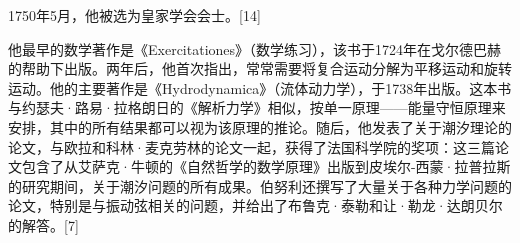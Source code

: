 1750年5月，他被选为皇家学会会士。[14]



他最早的数学著作是《Exercitationes》（数学练习），该书于1724年在戈尔德巴赫的帮助下出版。两年后，他首次指出，常常需要将复合运动分解为平移运动和旋转运动。他的主要著作是《Hydrodynamica》（流体动力学），于1738年出版。这本书与约瑟夫·路易·拉格朗日的《解析力学》相似，按单一原理——能量守恒原理来安排，其中的所有结果都可以视为该原理的推论。随后，他发表了关于潮汐理论的论文，与欧拉和科林·麦克劳林的论文一起，获得了法国科学院的奖项：这三篇论文包含了从艾萨克·牛顿的《自然哲学的数学原理》出版到皮埃尔-西蒙·拉普拉斯的研究期间，关于潮汐问题的所有成果。伯努利还撰写了大量关于各种力学问题的论文，特别是与振动弦相关的问题，并给出了布鲁克·泰勒和让·勒龙·达朗贝尔的解答。[7]